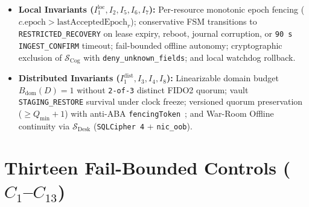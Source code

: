\documentclass[10pt,twocolumn]{article}
\begin{document}
\begin{itemize}[leftmargin=1.3em,itemsep=2pt,topsep=3pt]
  \item \textbf{Local Invariants ($I_1^{\mathrm{loc}}, I_2, I_5, I_6, I_7$):} Per-resource monotonic epoch fencing ($c.\mathrm{epoch} > \mathrm{lastAcceptedEpoch}_r$); conservative FSM transitions to \texttt{RESTRICTED\_RECOVERY} on lease expiry, reboot, journal corruption, or \texttt{90 s} \texttt{INGEST\_CONFIRM} timeout; fail-bounded offline autonomy; cryptographic exclusion of $\mathcal{S}_{\mathrm{Cog}}$ with \texttt{deny\_unknown\_fields}; and local watchdog rollback.
  \item \textbf{Distributed Invariants ($I_1^{\mathrm{dist}}, I_3, I_4, I_8$):} Linearizable domain budget $B_{\mathrm{dom}}(D)=1$ without \texttt{2-of-3} distinct FIDO2 quorum; vault \texttt{STAGING\_RESTORE} survival under clock freeze; versioned quorum preservation ($\ge Q_{\min}+1$) with anti-ABA \texttt{fencingToken}~\cite{R60}; and War-Room Offline continuity via $\mathcal{S}_{\mathrm{Desk}}$ (\texttt{SQLCipher 4} + \texttt{nic\_oob}).
\end{itemize}

\section{Thirteen Fail-Bounded Controls ($C_1$--$C_{13}$)}
\end{document}
